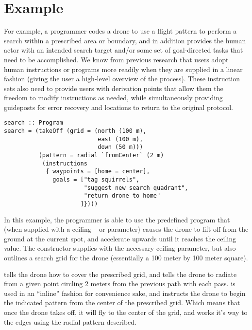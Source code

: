 \documentclass{sig-alternate-05-2015}
\begin{document}
\section{Example}
\label{sec:example}
For example, a programmer codes a drone to use a flight pattern to perform
a search within a prescribed area or boundary, and in addition provides the
human actor with an intended search target and/or some set of goal-directed
tasks that need to be accomplished. We know from previous research
\cite{abbott2015prog} that users adopt human instructions or programs more
readily when they are supplied in a linear fashion (giving the user a
high-level overview of the process). These instruction sets also need to
provide users with derivation points that allow them the freedom to modify
instructions as needed, while simultaneously providing guideposts for error
recovery and locations to return to the original protocol.

\begin{lstlisting}[breaklines=true]
search :: Program
search = (takeOff (grid = (north (100 m),
                           east (100 m),
                           down (50 m)))
          (pattern = radial `fromCenter` (2 m)
           (instructions
            { waypoints = [home = center],
              goals = ["tag squirrels",
                       "suggest new search quadrant",
                       "return drone to home"
                      ]})))
\end{lstlisting}

In this example, the programmer is able to use the predefined 
program that (when supplied with a ceiling -- or  parameter) causes
the drone to lift off from the ground at the current spot, and accelerate
upwards until it reaches the ceiling value. The  constructor
supplies  with the necessary ceiling parameter, but also
outlines a search grid for the drone (essentially a 100 meter by 100 meter
square).

 tells the drone how to cover the prescribed grid, and
 tells the drone to radiate from a given point circling
2 meters from the previous path with each pass.  is used in
an ``inline'' fashion for convenience sake, and instructs the drone to begin
the indicated pattern from the center of the prescribed grid. Which means that
once the drone takes off, it will fly to the center of the grid, and works
it's way to the edges using the radial pattern described.
\end{document}
